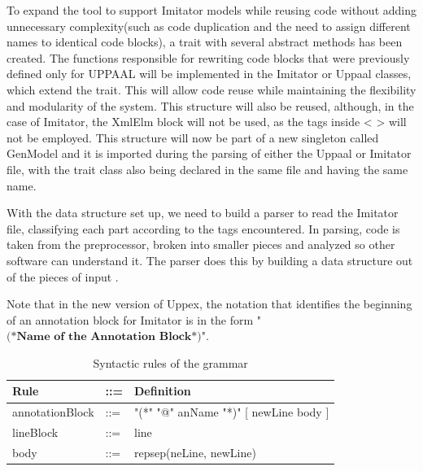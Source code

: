To expand the tool to support Imitator models while reusing code without adding unnecessary complexity(such as code duplication and the need to assign different names to identical code blocks), a trait with several abstract methods has been created. The functions responsible for rewriting code blocks that were previously defined only for UPPAAL will be implemented in the Imitator or Uppaal classes, which extend the trait. This will allow code reuse while maintaining the flexibility and modularity of the system.
This structure will also be reused, although, in the case of Imitator, the XmlElm block will not be used, as the tags inside < > will not be employed. This structure will now be part of a new singleton called GenModel and it is imported during the parsing of either the Uppaal or Imitator file, with the trait class also being declared in the same file and having the same name.



With the data structure set up, we need to build a parser to read the Imitator file, classifying each part according to the tags encountered. In parsing, code is taken from the preprocessor, broken into smaller pieces and analyzed so other software can understand it. The parser does this by building a data structure out of the pieces of input \cite{techtarget_parser}. 

Note that in the new version of Uppex, the notation that identifies the beginning of an annotation block for Imitator is in the form "$\textbf{(*Name of the Annotation Block*)}$".%



\begin{table}[h]
    \centering
    \begin{tcolorbox}[colback=gray!10, colframe=black]
    \caption{Syntactic rules of the grammar}
    \label{tab:syntactic-rules_fin}
    \begin{tabular}{L L L}
        \textbf{Rule} & \textbf{::=} & \textbf{Definition} \\
        \hline
        annotationBlock & ::= & "(*" "@" anName "*)" [ newLine body ] \\
        lineBlock & ::= & line \\
        body & ::= & repsep(neLine, newLine) \\
    \end{tabular}
    \end{tcolorbox}
\end{table}

